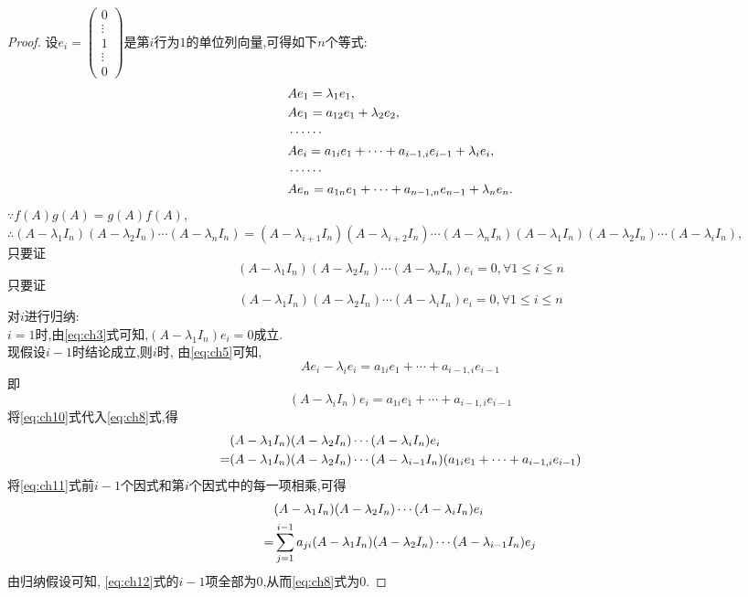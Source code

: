 \begin{proof}
  设$e_i=
  \begin{pmatrix}
    0\\
    \vdots\\
    1\\
    \vdots\\
    0
  \end{pmatrix}
  $是第$i$行为$1$的单位列向量,可得如下$n$个等式:
  \begin{align}
    &Ae_1=\lambda_1e_1\label{eq:ch3},\\
    &Ae_1=a_{12}e_1+\lambda_2e_2\label{eq:ch4},\\
    &\cdots\cdots\notag\\
    &Ae_i=a_{1i}e_1+\cdots+a_{i-1,i}e_{i-1}+\lambda_ie_i\label{eq:ch5},\\
    &\cdots\cdots\notag\\
    &Ae_n=a_{1n}e_1+\cdots+a_{n-1,n}e_{n-1}+\lambda_ne_n\label{eq:ch6}.
  \end{align}
  $\because f(A)g(A)=g(A)f(A)$,\\
  $\therefore (A-\lambda_1I_n)(A-\lambda_2I_n)\cdots(A-\lambda_nI_n)=
  (A-\lambda_{i+1}I_n)(A-\lambda_{i+2}I_n)\cdots(A-\lambda_nI_n)
  (A-\lambda_1I_n)(A-\lambda_2I_n)\cdots(A-\lambda_iI_n)$,\\
  只要证
  \begin{equation}\label{eq:ch7}
   (A-\lambda_1I_n)(A-\lambda_2I_n)\cdots(A-\lambda_nI_n)e_i=0,
  \forall 1 \leq i \leq n 
  \end{equation}
  只要证
  \begin{equation}
    \label{eq:ch8}
    (A-\lambda_1I_n)(A-\lambda_2I_n)\cdots(A-\lambda_iI_n)e_i=0,
    \forall 1 \leq i \leq n
  \end{equation}
  对$i$进行归纳:\\
  $i=1$时,由\eqref{eq:ch3}式可知,$(A-\lambda_1I_n)e_i=0$成立.\\
  现假设$i-1$时结论成立,则$i$时,
  由\eqref{eq:ch5}可知,
  \begin{equation}
    \label{eq:ch9}
    Ae_i-\lambda_ie_i = a_{1i}e_1+\cdots+a_{i-1,i}e_{i-1}
  \end{equation}
  即
  \begin{equation}
    \label{eq:ch10}
    (A-\lambda_iI_n)e_i= a_{1i}e_1+\cdots+a_{i-1,i}e_{i-1}
  \end{equation}
  将\eqref{eq:ch10}式代入\eqref{eq:ch8}式,得
  \begin{align}
    &(A-\lambda_1I_n)(A-\lambda_2I_n)\cdots(A-\lambda_iI_n)e_i\notag\\
    = &(A-\lambda_1I_n)(A-\lambda_2I_n)\cdots(A-\lambda_{i-1}I_n)(a_{1i}e_1+\cdots+a_{i-1,i}e_{i-1})\label{eq:ch11}
  \end{align}
  将\eqref{eq:ch11}式前$i-1$个因式和第$i$个因式中的每一项相乘,可得
  \begin{align}
    &(A-\lambda_1I_n)(A-\lambda_2I_n)\cdots(A-\lambda_iI_n)e_i\notag\\
    =&\sum\limits_{j=1}^{i-1}a_{ji}(A-\lambda_1I_n)(A-\lambda_2I_n)\cdots(A-\lambda_{i-1}I_n)e_j\label{eq:ch12}
  \end{align}
  由归纳假设可知, \eqref{eq:ch12}式的$i-1$项全部为$0$,从而\eqref{eq:ch8}式为$0$.
\end{proof}

